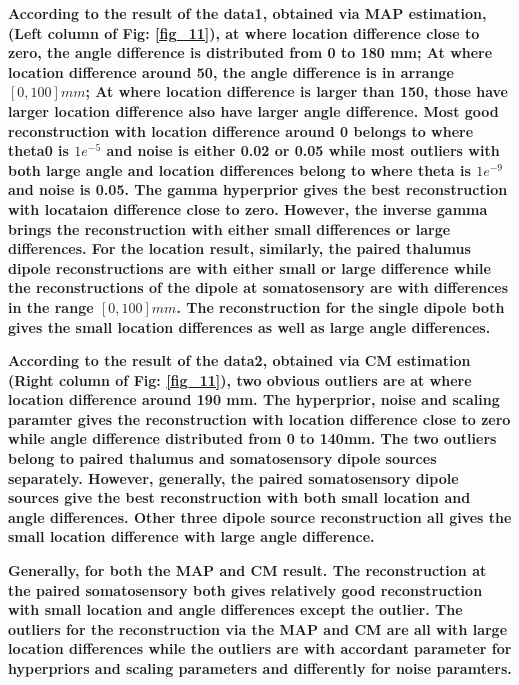 \documentclass[5p]{elsarticle}
\begin{document}
\begin{frontmatter}
\bf According to the result of the data1, obtained via MAP estimation, (Left column of Fig: \ref{fig_11}), at where location difference close to zero, the angle difference is distributed from 0 to 180 mm; At where location difference around 50, the angle difference is in arrange $[0,100]mm$; At where location difference is larger than 150, those have larger location difference also have larger angle difference. Most good reconstruction with location difference around 0 belongs to where theta0 is $ 1e^{-5} $ and noise is either 0.02 or 0.05 while most outliers with both large angle and location differences belong to where theta is $ 1e^{-9} $ and noise is 0.05. The gamma hyperprior gives the best reconstruction with locataion difference close to zero. However, the inverse gamma brings the reconstruction with either small differences or large differences. For the location result, similarly, the paired thalumus dipole reconstructions are with either small or large difference while the reconstructions of the dipole at somatosensory are with differences in the range $[0,100]mm$. The reconstruction for the single dipole both gives the small location differences as well as large angle differences.

\bf According to the result of the data2, obtained via CM estimation (Right column of Fig: \ref{fig_11}), two obvious outliers are at where location difference around 190 mm. The hyperprior, noise and scaling paramter gives the reconstruction with location difference close to zero while angle difference distributed from 0 to 140mm. The two outliers belong to paired thalumus and somatosensory dipole sources separately. However, generally, the paired somatosensory dipole sources give the best reconstruction with both small location and angle differences. Other three dipole source reconstruction all gives the small location difference with large angle difference.

\bf Generally, for both the MAP and CM result. The reconstruction at the paired somatosensory both gives relatively good reconstruction with small location and angle differences except the outlier. The outliers for the reconstruction via the MAP and CM are all with large location differences while the outliers are with accordant parameter for hyperpriors and scaling parameters and differently for noise paramters.



\end{frontmatter}
\end{document}

